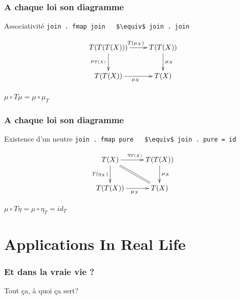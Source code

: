 \documentclass{beamer}
\begin{document}
\begin{frame}
\frametitle{A chaque loi son diagramme}
\begin{alertblock}{Associativité}
\verb!join . fmap join   $\equiv$ join . join!
\end{alertblock}

\begin{block}{}

\[
\xymatrix{
T(T(T(X))) \ar[r]^{T(\mu_X)} \ar[d]_{\mu_{T(X)}} & T(T(X)) \ar[d]^{\mu_X} \\
T(T(X)) \ar[r]_{\mu_X} & T(X) \\
}
\]
\end{block}

\begin{block}{}
\begin{center}
$\mu \circ T\mu = \mu \circ \mu_T$
\end{center}
\end{block}

\end{frame}

\begin{frame}
\frametitle{A chaque loi son diagramme}
\begin{alertblock}{Existence d'un neutre}
\verb!join . fmap pure   $\equiv$ join . pure = id!
\end{alertblock}

\begin{block}{}
\[
\xymatrix{
T(X) \ar[r]^{\eta_{T(X)}} \ar[d]_{T(\eta_X)}  \ar@{=}[dr] & T(T(X)) \ar[d]^{\mu_X} \\
T(T(X)) \ar[r]_{\mu_X} & T(X) \\
}
\]
\end{block}

\begin{block}{}
\begin{center}
$\mu \circ T \eta = \mu \circ \eta_T = id_T$
\end{center}
\end{block}

\end{frame}

\section{Applications In Real Life}
\begin{frame}
  \frametitle{Et dans la vraie vie ?}
  \begin{alertblock}{}
  \begin{center}
    Tout ça, à quoi ça sert?
  \end{center}
  \end{alertblock}
\end{frame}
\end{document}
